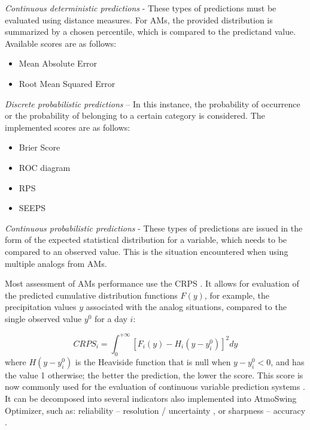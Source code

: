 \documentclass[gmd]{copernicus}
\begin{document}
\textit{Continuous deterministic predictions} - These types of predictions must be evaluated using distance measures. For AMs, the provided distribution is summarized by a chosen percentile, which is compared to the predictand value. Available scores are as follows:

\begin{itemize}
	\item Mean Absolute Error
	\item Root Mean Squared Error
\end{itemize}


\textit{Discrete probabilistic predictions} – In this instance, the probability of occurrence or the probability of belonging to a certain category is considered. The implemented scores are as follows:

\begin{itemize}
	\item Brier Score \citep{Brier1950}
	\item ROC diagram \citep[Relative Operating Characteristic or Receiver Operating Characteristic,][]{Mason1982}
	\item RPS \citep[Ranked Probability Score,][]{Epstein1969}
	\item SEEPS \citep[Stable Equitable Error in Probability Space,][]{Rodwell2010,Rodwell2011}
\end{itemize}


\textit{Continuous probabilistic predictions} - These types of predictions are issued in the form of the expected statistical distribution for a variable, which needs to be compared to an observed value. This is the situation encountered when using multiple analogs from AMs.

Most assessment of AMs performance use the CRPS \citep[Continuous Ranked Probability Score,][]{Brown1974, Matheson1976, Hersbach2000}. It allows for evaluation of the predicted cumulative distribution functions $F(y)$, for example, the precipitation values $y$ associated with the analog situations, compared to the single observed value $y^{0}$ for a day $i$:

\begin{equation}
\label{eq:CRPS}
CRPS_{i} = \int_{0}^{+\infty} \left[ F_{i}(y)-H_{i}(y-y_{i}^{0})\right]^{2} dy
\end{equation}
where $H(y-y_{i}^{0})$ is the Heaviside function that is null when $y-y_{i}^{0}<0$, and has the value 1 otherwise; the better the prediction, the lower the score. This score is now commonly used for the evaluation of continuous variable prediction systems \citep{Casati2008, Marty2010}. It can be decomposed into several indicators also implemented into AtmoSwing Optimizer, such as: reliability -- resolution / uncertainty \citep{Hersbach2000}, or sharpness -- accuracy \citep{Bontron2004}.
\end{document}

